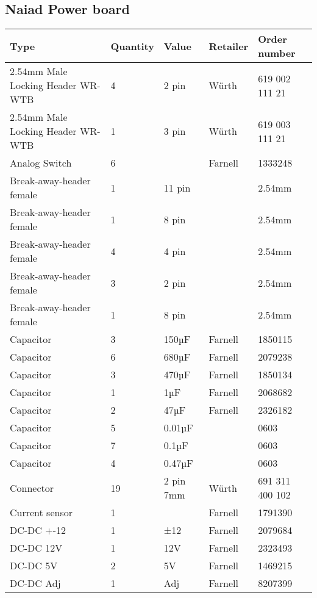 \subsection{Naiad Power board}
\begin{center}
\begin{tabularx}{\textwidth}{|X|l|l|l|l|}
    \hline
   \textbf{Type} & \textbf{Quantity} & \textbf{Value} & \textbf{Retailer} & \textbf{Order number} \\ \hline
    2.54mm Male Locking Header WR-WTB & 4 & 2 pin & Würth & 619 002 111 21 \\ \hline
    2.54mm Male Locking Header WR-WTB & 1 & 3 pin & Würth & 619 003 111 21 \\ \hline
    Analog Switch & 6 & & Farnell & 1333248 \\ \hline
    Break-away-header female & 1 & 11 pin & & 2.54mm \\ \hline
    Break-away-header female & 1 & 8 pin & & 2.54mm \\ \hline
    Break-away-header female & 4 & 4 pin & & 2.54mm \\ \hline
    Break-away-header female & 3 & 2 pin & & 2.54mm \\ \hline
    Break-away-header female & 1 & 8 pin & & 2.54mm \\ \hline
    Capacitor & 3 & 150µF & Farnell & 1850115 \\ \hline
    Capacitor & 6 & 680µF & Farnell & 2079238 \\ \hline
    Capacitor & 3 & 470µF & Farnell & 1850134 \\ \hline
    Capacitor & 1 & 1µF & Farnell & 2068682 \\ \hline
    Capacitor & 2 & 47µF & Farnell & 2326182 \\ \hline
    Capacitor & 5 & 0.01µF & & 0603  \\ \hline
    Capacitor & 7 & 0.1µF & & 0603 \\ \hline
    Capacitor & 4 & 0.47µF & & 0603 \\ \hline
    Connector & 19 & 2 pin 7mm & Würth & 691 311 400 102 \\ \hline
    Current sensor & 1 & & Farnell & 1791390 \\ \hline
    DC-DC +-12 & 1 & ±12 & Farnell & 2079684 \\ \hline
    DC-DC 12V & 1 & 12V & Farnell & 2323493 \\ \hline
    DC-DC 5V & 2 & 5V & Farnell & 1469215 \\ \hline
    DC-DC Adj & 1 & Adj & Farnell & 8207399 \\ \hline

\end{tabularx}
\end{center}
